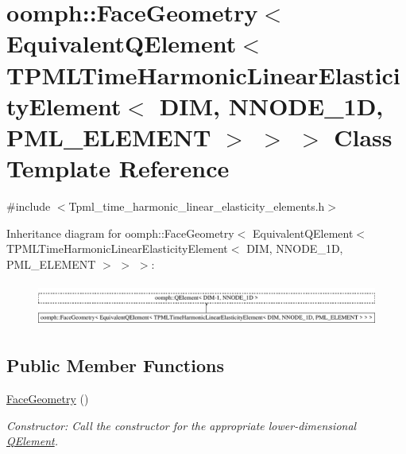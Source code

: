 \hypertarget{classoomph_1_1FaceGeometry_3_01EquivalentQElement_3_01TPMLTimeHarmonicLinearElasticityElement_3_9956b642c3d365104321ed7a38eb862c}{}\section{oomph\+:\+:Face\+Geometry$<$ Equivalent\+Q\+Element$<$ T\+P\+M\+L\+Time\+Harmonic\+Linear\+Elasticity\+Element$<$ D\+IM, N\+N\+O\+D\+E\+\_\+1D, P\+M\+L\+\_\+\+E\+L\+E\+M\+E\+NT $>$ $>$ $>$ Class Template Reference}
\label{classoomph_1_1FaceGeometry_3_01EquivalentQElement_3_01TPMLTimeHarmonicLinearElasticityElement_3_9956b642c3d365104321ed7a38eb862c}


{\ttfamily \#include $<$Tpml\+\_\+time\+\_\+harmonic\+\_\+linear\+\_\+elasticity\+\_\+elements.\+h$>$}

Inheritance diagram for oomph\+:\+:Face\+Geometry$<$ Equivalent\+Q\+Element$<$ T\+P\+M\+L\+Time\+Harmonic\+Linear\+Elasticity\+Element$<$ D\+IM, N\+N\+O\+D\+E\+\_\+1D, P\+M\+L\+\_\+\+E\+L\+E\+M\+E\+NT $>$ $>$ $>$\+:\begin{figure}[H]
\begin{center}
\leavevmode
\includegraphics[height=1.448900cm]{classoomph_1_1FaceGeometry_3_01EquivalentQElement_3_01TPMLTimeHarmonicLinearElasticityElement_3_9956b642c3d365104321ed7a38eb862c}
\end{center}
\end{figure}
\subsection*{Public Member Functions}
\begin{DoxyCompactItemize}
\item 
\hyperlink{classoomph_1_1FaceGeometry_3_01EquivalentQElement_3_01TPMLTimeHarmonicLinearElasticityElement_3_9956b642c3d365104321ed7a38eb862c_a76a6d3d630aaef411047be9f7cd8768d}{Face\+Geometry} ()
\begin{DoxyCompactList}\small\item\em Constructor\+: Call the constructor for the appropriate lower-\/dimensional \hyperlink{classoomph_1_1QElement}{Q\+Element}. \end{DoxyCompactList}\end{DoxyCompactItemize}


